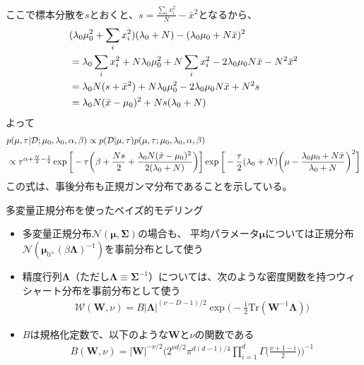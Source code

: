 \documentclass[aspectratio=169,unicode,dvipdfmx,14pt]{beamer}
\begin{document}
\begin{frame}
\FontMath
ここで標本分散を$s$とおくと、$s = \frac{\sum_i x_i^2}{N} - \bar{x}^2$となるから、
\begin{align}
& (\lambda_0 \mu_0^2 + \sum_i x_i^2)( \lambda_0 + N )
- ( \lambda_0 \mu_0 + N\bar{x} )^2
\notag \\ & =
\lambda_0 \sum_i x_i^2 + N \lambda_0 \mu_0^2 + N \sum_i x_i^2
- 2 \lambda_0 \mu_0 N\bar{x} - N^2 \bar{x}^2
\notag \\ & =
\lambda_0 N ( s + \bar{x}^2 )
+ N \lambda_0 \mu_0^2 - 2 \lambda_0 \mu_0 N\bar{x} + N^2 s
\notag \\ & =
\lambda_0 N (\bar{x} - \mu_0)^2 + Ns(\lambda_0 + N)
\end{align}
よって
\begin{align}
& p(\mu,\tau|\mathcal{D};\mu_0, \lambda_0, \alpha, \beta)
\propto p(\mathcal{D}|\mu,\tau) p(\mu, \tau ; \mu_0, \lambda_0, \alpha, \beta)
\notag \\ & \propto
\tau^{\alpha + \frac{N}{2} - \frac{1}{2}}
\exp \bigg[ - \tau \bigg( \beta + \frac{Ns}{2} + \frac{ \lambda_0 N (\bar{x} - \mu_0)^2 }{ 2( \lambda_0 + N ) }
\bigg) \bigg]
\exp \bigg[ - \frac{\tau}{2} ( \lambda_0 + N ) \bigg( \mu - \frac{ \lambda_0 \mu_0 + N\bar{x} }{ \lambda_0 + N } \bigg)^2 \bigg]
\end{align}
この式は、事後分布も正規ガンマ分布であることを示している。
\end{frame}

\begin{frame}{多変量正規分布を使ったベイズ的モデリング}
\begin{itemize}
\item 多変量正規分布$\mathcal{N}(\bm{\mu},\bm{\Sigma})$の場合も、
平均パラメータ$\bm{\mu}$については正規分布$\mathcal{N}(\bm{\mu}_0,(\beta\bm{\Lambda})^{-1})$を事前分布として使う
\item 精度行列$\bm{\Lambda}$（ただし$\bm{\Lambda} \equiv \bm{\Sigma}^{-1}$）については、次のような密度関数を持つウィシャート分布を事前分布として使う
\begin{align}
\mathcal{W}(\bm{W},\nu) = B|\bm{\Lambda}|^{(\nu -D-1)/2} \exp\bigg( - \frac{1}{2} \mbox{Tr}(\bm{W}^{-1}\bm{\Lambda} ) \bigg)
\end{align}
\item $B$は規格化定数で、以下のような$\bm{W}$と$\nu$の関数である
\begin{align}
B(\bm{W},\nu)=|\bm{W}|^{-\nu/2}\bigg(2^{\nu d/2}\pi^{d(d-1)/4} \prod_{i=1}^d \Gamma\Big(\frac{\nu + 1 - i}{2}\Big) \bigg)^{-1}
\end{align}
\end{itemize}
\end{frame}
\end{document}
